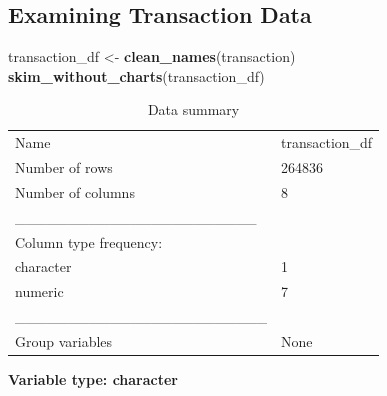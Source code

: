 \documentclass[
]{article}
\newenvironment{Shaded}{\begin{snugshade}}{\end{snugshade}}
\newcommand{\FunctionTok}[1]{\textcolor[rgb]{0.13,0.29,0.53}{\textbf{#1}}}
\newcommand{\NormalTok}[1]{#1}
\newcommand{\OtherTok}[1]{\textcolor[rgb]{0.56,0.35,0.01}{#1}}
\begin{document}
\hypertarget{examining-transaction-data}{%
\subsection{Examining Transaction
Data}\label{examining-transaction-data}}

\begin{Shaded}
\begin{Highlighting}[]
\NormalTok{transaction\_df }\OtherTok{\textless{}{-}} \FunctionTok{clean\_names}\NormalTok{(transaction)}
\FunctionTok{skim\_without\_charts}\NormalTok{(transaction\_df)}
\end{Highlighting}
\end{Shaded}

\begin{longtable}[]{@{}ll@{}}
\caption{Data summary}\tabularnewline
\toprule\noalign{}
\endfirsthead
\endhead
\bottomrule\noalign{}
\endlastfoot
Name & transaction\_df \\
Number of rows & 264836 \\
Number of columns & 8 \\
\_\_\_\_\_\_\_\_\_\_\_\_\_\_\_\_\_\_\_\_\_\_\_ & \\
Column type frequency: & \\
character & 1 \\
numeric & 7 \\
\_\_\_\_\_\_\_\_\_\_\_\_\_\_\_\_\_\_\_\_\_\_\_\_ & \\
Group variables & None \\
\end{longtable}

\textbf{Variable type: character}
\end{document}
